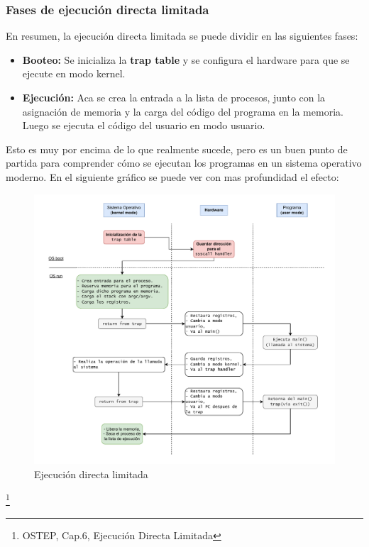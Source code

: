 \documentclass{article}
\begin{document}
\subsubsection{Fases de ejecución directa limitada}
En resumen, la ejecución directa limitada se puede dividir en las siguientes fases:
\begin{itemize}
    \item \textbf{Booteo:} Se inicializa la \textbf{trap table} y se configura el hardware para que se ejecute en modo kernel.
    \item \textbf{Ejecución:} Aca se crea la entrada a la lista de procesos, junto con la asignación de memoria y la carga del código del programa en la memoria. Luego se ejecuta el código del usuario en modo usuario.
\end{itemize}
Esto es muy por encima de lo que realmente sucede, pero es un buen punto de partida para comprender cómo se ejecutan los programas en un sistema operativo moderno. En el siguiente gráfico se puede ver con mas profundidad el efecto:
\newpage
\begin{figure}[h]
    \centering
    \includegraphics[width=1\textwidth]{src/edl2.pdf}
    \caption{Ejecución directa limitada}
\end{figure} \footnote{OSTEP, Cap.6, Ejecución Directa Limitada}
\end{document}
